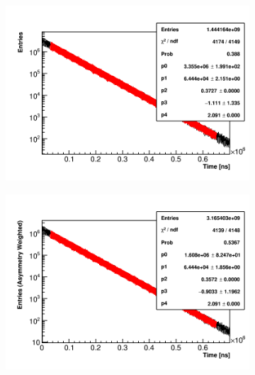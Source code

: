 \begin{figure}[]
\centering
    \begin{subfigure}[t]{0.45\textwidth}
        \centering
        \includegraphics[width=\textwidth]{Example_TMethod_Fit}
        \caption{}
    \end{subfigure}
    \hspace{1mm}
    \begin{subfigure}[t]{0.45\textwidth}
        \centering
        \includegraphics[width=\textwidth]{Example_AMethod_Fit}
        \caption{}
    \end{subfigure}%


\end{figure}
